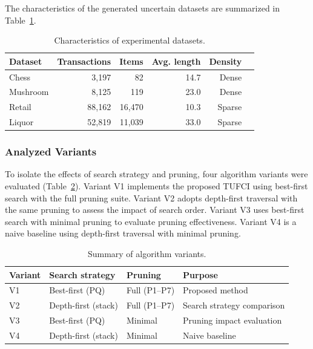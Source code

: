 \documentclass[10pt,letterpaper]{article}
\begin{document}
The characteristics of the generated uncertain datasets are summarized in Table~\ref{tab:datasets}.

\begin{table}[H]
\centering
\caption{Characteristics of experimental datasets.}
\label{tab:datasets}
\begin{tabular}{lrrrrl}
\hline
\textbf{Dataset} & \textbf{Transactions} & \textbf{Items} & \textbf{Avg. length} & \textbf{Density} \\
\hline
Chess      & 3,197  & 82     & 14.7  & Dense \\
Mushroom   & 8,125  & 119    & 23.0  & Dense \\
Retail     & 88,162 & 16,470 & 10.3  & Sparse \\
Liquor     & 52,819 & 11,039 & 33.0  & Sparse \\
\hline
\end{tabular}
\end{table}

\subsubsection*{Analyzed Variants}

To isolate the effects of search strategy and pruning, four algorithm variants were evaluated (Table~\ref{tab:variants}). Variant V1 implements the proposed TUFCI using best-first search with the full pruning suite. Variant V2 adopts depth-first traversal with the same pruning to assess the impact of search order. Variant V3 uses best-first search with minimal pruning to evaluate pruning effectiveness. Variant V4 is a naive baseline using depth-first traversal with minimal pruning.

\begin{table}[H]
\centering
\caption{Summary of algorithm variants.}
\label{tab:variants}
\begin{tabular}{llll}
\hline
\textbf{Variant} & \textbf{Search strategy} & \textbf{Pruning} & \textbf{Purpose} \\
\hline
V1 & Best-first (PQ) & Full (P1--P7) & Proposed method \\
V2 & Depth-first (stack) & Full (P1--P7) & Search strategy comparison \\
V3 & Best-first (PQ) & Minimal & Pruning impact evaluation \\
V4 & Depth-first (stack) & Minimal & Naive baseline \\
\hline
\end{tabular}
\end{table}
\end{document}
